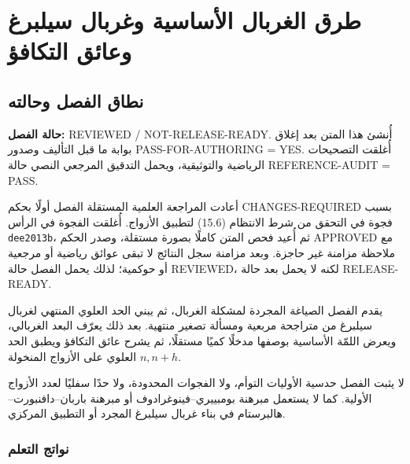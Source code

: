 \chapter{طرق الغربال الأساسية وغربال سيلبرغ وعائق التكافؤ}

\section{نطاق الفصل وحالته}

\noindent\textbf{حالة الفصل:}
\textenglish{REVIEWED / NOT-RELEASE-READY}.
أُنشئ هذا المتن بعد إغلاق بوابة ما قبل التأليف وصدور
\textenglish{PASS-FOR-AUTHORING = YES}. أُغلقت التصحيحات الرياضية والتوثيقية،
ويحمل التدقيق المرجعي النصي حالة
\textenglish{REFERENCE-AUDIT = PASS}.

أعادت المراجعة العلمية المستقلة الفصل أولًا بحكم
\textenglish{CHANGES-REQUIRED} بسبب فجوة في التحقق من شرط الانتظام (15.6)
لتطبيق الأزواج. أُغلقت الفجوة في الرأس
\texttt{dee2013b}، ثم أُعيد فحص المتن
كاملًا بصورة مستقلة، وصدر الحكم
\textenglish{APPROVED} مع ملاحظة مزامنة غير حاجزة. وبعد مزامنة سجل النتائج
لا تبقى عوائق رياضية أو مرجعية أو حوكمية؛ لذلك يحمل الفصل حالة
\textenglish{REVIEWED}، لكنه لا يحمل بعد حالة
\textenglish{RELEASE-READY}.

يقدم الفصل الصياغة المجردة لمشكلة الغربال، ثم يبني الحد العلوي المنتهي لغربال
سيلبرغ من متراجحة مربعية ومسألة تصغير منتهية. بعد ذلك يعرّف البعد الغربالي،
ويعرض اللمّة الأساسية بوصفها مدخلًا كميًا مستقلًا، ثم يشرح عائق التكافؤ ويطبق
الحد العلوي على الأزواج المنخولة \(n,n+h\).

لا يثبت الفصل حدسية الأوليات التوأم، ولا الفجوات المحدودة، ولا حدًا سفليًا لعدد
الأزواج الأولية. كما لا يستعمل مبرهنة بومبييري--فينوغرادوف أو مبرهنة
باربان--دافنبورت--هالبرستام في بناء غربال سيلبرغ المجرد أو التطبيق المركزي.
\subsection{نواتج التعلم}

